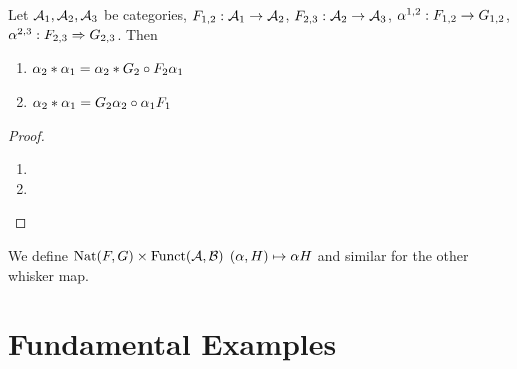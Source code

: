 \documentclass{book}
\begin{document}
	\begin{ex} 
		Let $\mathcal{A}_1, \mathcal{A}_2, \mathcal{A}_3$ be categories, $F_{1,2}: \mathcal{A}_1 \rightarrow \mathcal{A}_2$, $F_{2,3}: \mathcal{A}_2 \rightarrow \mathcal{A}_3$, $\alpha^{1,2}: F_{1,2} \rightarrow G_{1,2}$, $\alpha^{2,3}: F_{2,3} \Rightarrow G_{2,3}$. Then
		\begin{enumerate}
			\item $\alpha_2 * \alpha_1 = \alpha_2 * G_2 \circ F_2 \alpha_1$
			\item $\alpha_2 * \alpha_1 = G_2 \alpha_2 \circ \alpha_1 F_1$
		\end{enumerate}
	\end{ex}
	
	\begin{proof}\
		\begin{enumerate}
			\item 
			\item 
		\end{enumerate}
	\end{proof}
	
	\begin{defn}
		We define $\text{Nat}(F, G) \times \text{Funct}(\mathcal{A}, \mathcal{B})$ $(\alpha, H) \mapsto \alpha H$ and similar for the other whisker map.
		\tcr{FINISH!!!}
	\end{defn}
	
	
	
	
	












































	\section{Fundamental Examples}
	
\end{document}
